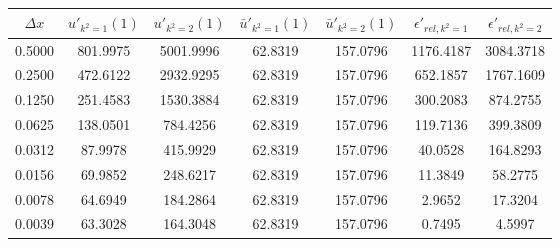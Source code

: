 \begin{tabular}{|c|c|c|c|c|c|c|}
\hline
\textbf{$\Delta x$}&\textbf{$u'_{k^2=1}(1)$}&\textbf{$u'_{k^2=2}(1)$}&\textbf{$\bar{u}'_{k^2=1}(1)$}&\textbf{$\bar{u}'_{k^2=2}(1)$}&\textbf{$\epsilon'_{rel,k^2=1}$}&\textbf{$\epsilon'_{rel,k^2=2}$}\\\hline
0.5000&801.9975&5001.9996&62.8319&157.0796&1176.4187&3084.3718\\\hline
0.2500&472.6122&2932.9295&62.8319&157.0796&652.1857&1767.1609\\\hline
0.1250&251.4583&1530.3884&62.8319&157.0796&300.2083&874.2755\\\hline
0.0625&138.0501&784.4256&62.8319&157.0796&119.7136&399.3809\\\hline
0.0312&87.9978&415.9929&62.8319&157.0796&40.0528&164.8293\\\hline
0.0156&69.9852&248.6217&62.8319&157.0796&11.3849&58.2775\\\hline
0.0078&64.6949&184.2864&62.8319&157.0796&2.9652&17.3204\\\hline
0.0039&63.3028&164.3048&62.8319&157.0796&0.7495&4.5997\\\hline
\end{tabular}
